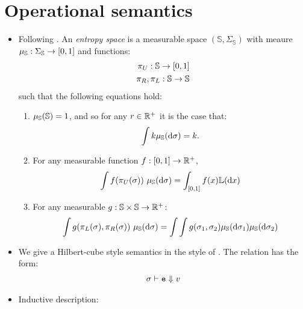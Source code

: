 \documentclass{tufte-handout}
\begin{document}
\section{Operational semantics}

\begin{itemize}
  \item Following \citet{culpepper2017contextual}. An \emph{entropy space} is a
  measurable space $(\mathbb{S}, \Sigma_{\mathbb{S}})$ with meaure $\mu_{\mathbb{S}} :
  \Sigma_{\mathbb{S}} \rightarrow [0,1]$ and functions:
  \begin{align}
    \pi_U : \mathbb{S} \rightarrow [0,1] \\
    \pi_R, \pi_L: \mathbb{S} \rightarrow \mathbb{S}
  \end{align} 
  such that the following equations hold:
  \begin{enumerate}
    \item $\mu_{\mathbb{S}} (\mathbb{S}) = 1$, and so for any $r \in \mathbb{R}^+$ it is the case that:
    \begin{align} 
      \int k \mu_\ent(\mathrm{d}\sigma) = k.
      \label{eq:value}
    \end{align}
    \item For any measurable function $f : [0,1] \rightarrow \mathbb{R}^+$,
    \begin{align}
      \int f(\pi_U(\sigma))~\mu_\ent(\mathrm{d}\sigma) = \int_{[0,1]} f(x) \lebesgue(\mathrm{d}x)
      \label{eq:meas}
    \end{align}
    \item For any measurable $g : \mathbb{S} \times \mathbb{S} \rightarrow \mathbb{R}^+$:
    \begin{align}
      \int g(\pi_L(\sigma), \pi_R(\sigma))~\mu_{\mathbb{S}}(\mathrm{d}\sigma) = \int\int g(\sigma_1, \sigma_2) \mu_{\mathbb{S}}(\mathrm{d}\sigma_1) \mu_{\mathbb{S}}(\mathrm{d}\sigma_2)
    \end{align}
  \end{enumerate}
  \item We give a Hilbert-cube style semantics in the style of
  \citet{wand2018contextual}. The relation has the form:
  \begin{align}
    \sigma \vdash \texttt{e} \Downarrow v
  \end{align}
  \item Inductive description:
\end{itemize}
\end{document}

